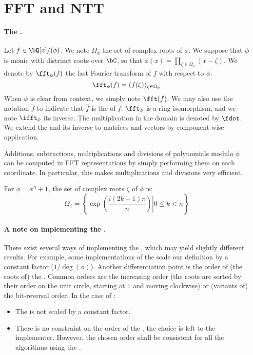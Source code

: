 \section{FFT and NTT} \label{sec:spec:fftntt}


\paragraph{The \fft.} Let $f \in \bQ[x]/(\phi)$. We note $\Omega_\phi$ the set of complex roots of $\phi$. We suppose that $\phi$ is monic with distrinct roots over $\bC$, so that $\phi(x) = \prod\limits_{\zeta \in \Omega_\phi} (x - \zeta)$. We denote by $\fft_\phi(f)$ the fast Fourier transform of $f$ with respect to $\phi$:
\begin{equation}
 \fft_\phi(f) = (f(\zeta))_{\zeta \in \Omega_\phi}
\end{equation}
When $\phi$ is clear from context, we simply note $\fft(f)$. We may also use the notation $\hat f$ to indicate that $\hat f$ is the \fft of $f$. $\fft_\phi$ is a ring isomorphism, and we note $\ifft_\phi$ its inverse. The multiplication in the \fft domain is denoted by $\fdot$. We extend the \fft and its inverse to matrices and vectors by component-wise application.

Additions, subtractions, multiplications and divisions of polynomials
modulo $\phi$ can be computed in FFT representations by simply
performing them on each coordinate. In particular, this makes
multiplications and divisions very efficient.

For $\phi = x^n + 1$, the set of complex roots $\zeta$ of $\phi$ is:
\begin{equation}\label{eq:phi}
\Omega_\phi = \left\{\left. \exp\left(\frac{i (2k+1)\pi}{n}\right) \right| 0 \leq k < n \right\}
\end{equation}


\paragraph{A note on implementing the \fft.} There exist several ways of implementing the \fft, which may yield slightly different results. For example, some implementations of the \fft scale our definition by a constant factor (\eg $1/\deg(\phi)$). Another differentiation point is the order of (the roots of) the \fft. Common orders are the increasing order (\ie the roots are sorted by their order on the unit circle, starting at $1$ and moving clockwise) or (variants of) the bit-reversal order. In the case of \falcon:
\begin{itemize}
 \item The \fft is not scaled by a constant factor.
 \item There is no constraint on the order of the \fft, the choice is left to the implementer. However, the chosen order shall be consistent for all the algorithms using the \fft.
\end{itemize}


